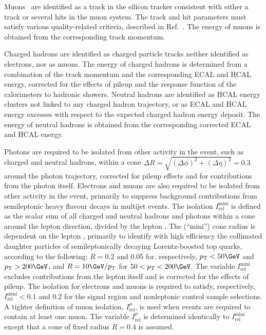 Muons~\cite{Chatrchyan:2012xi} are identified as a track in the
silicon tracker consistent with either a track or several hits in the
muon system. The track and hit parameters must satisfy various
quality-related criteria, described in Ref.~\cite{Chatrchyan:2012xi}. 
The energy of muons is obtained from the corresponding track momentum.

Charged hadrons are identified as charged particle tracks neither
identified as electrons, nor as muons. The energy of charged hadrons
is determined from a combination of the track momentum and the
corresponding ECAL and HCAL energy, corrected for the effects of
pileup and the response function of the calorimeters to hadronic
showers. Neutral hadrons are identified as HCAL energy clusters not
linked to any charged hadron trajectory, or as ECAL and HCAL energy
excesses with respect to the expected charged hadron energy deposit.
The energy of neutral hadrons is obtained from the corresponding
corrected ECAL and HCAL energy.

Photons are required to be isolated from other activity in the event,
such as charged and neutral hadrons, within a cone $\Delta R =
\sqrt{(\Delta\phi)^2 + (\Delta\eta)^2} = 0.3$ around the photon
trajectory, corrected for pileup effects and for contributions from
the photon itself. Electrons and muons are also required to be
isolated from other activity in the event, primarily to suppress
background contributions from semileptonic heavy flavour decays in
multijet events. The isolation $I^\text{mini}_\text{rel}$ is defined
as the scalar \Pt sum of all charged and neutral hadrons and photons
within a cone around the lepton direction, divided by the lepton
\Pt. The (``mini'') cone radius is dependent on the lepton \Pt,
primarily to identify with high efficiency the collimated daughter
particles of semileptonically decaying Lorentz-boosted top quarks,
according to the following: $R = 0.2$ and 0.05 for, respectively, $\Pt
< 50\GeV$ and $\Pt > 200\GeV$, and $R = 10\GeV / \Pt$ for $50 < \Pt <
200\GeV$. The variable $I^\text{mini}_\text{rel}$ excludes
contributions from the lepton itself and is corrected for the effects
of pileup. The isolation for electrons and muons is required to
satisfy, respectively, $I^\text{mini}_\text{rel} < 0.1$ and 0.2 for
the signal region and nonleptonic control sample selections.  A
tighter definition of muon isolation, $I^{\mu}_\text{rel}$, is used
when events are required to contain at least one muon. The variable
$I^{\mu}_\text{rel}$ is determined identically to
$I^\text{mini}_\text{rel}$ except that a cone of fixed radius $R =
0.4$ is assumed.

